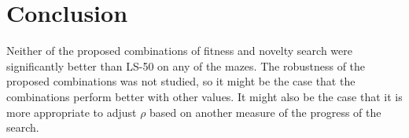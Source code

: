 \section{Conclusion}
\label{sec:conclusion}
Neither of the proposed combinations of fitness and novelty search were significantly better
than LS-50 on any of the mazes. The robustness of the proposed combinations was not studied, so
it might be the case that the combinations perform better with other values. It might also be the
case that it is more appropriate to adjust $\rho$ based on another measure of the progress of
the search.